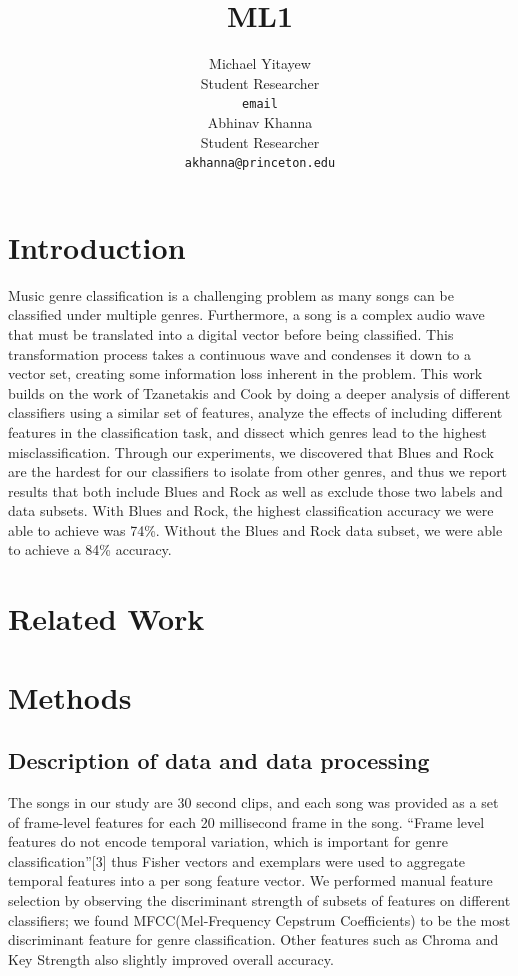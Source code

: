 \documentclass{article} %
\title{ML1}
\author{
Michael Yitayew\\
Student Researcher\\
\texttt{email} \\
\And
Abhinav Khanna \\
Student Researcher \\
\texttt{akhanna@princeton.edu} \\
}
\begin{document}
\maketitle

\begin{abstract}

\end{abstract}

\section{Introduction}

Music genre classification is a challenging problem as many songs can be classified under multiple genres. Furthermore, a song is a complex audio wave that must be translated into a digital vector before being classified. This transformation process takes a continuous wave and condenses it down to a vector set, creating some information loss inherent in the problem. This work builds on the work of Tzanetakis and Cook by doing a deeper analysis of different classifiers using a similar set of features, analyze the effects of including different features in the classification task, and dissect which genres lead to the highest misclassification. Through our experiments, we discovered that Blues and Rock are the hardest for our classifiers to isolate from other genres, and thus we report results that both include Blues and Rock as well as exclude those two labels and data subsets. With Blues and Rock, the highest classification accuracy we were able to achieve was 74\%. Without the Blues and Rock data subset, we were able to achieve a 84\% accuracy.

\section{Related Work}

\section{Methods}
\subsection{Description of data and data processing}
The songs in our study are 30 second clips, and each song was provided as a set of frame-level features for each 20 millisecond frame in the song. ``Frame level features do not encode temporal variation, which is important for genre classification''[3] thus Fisher vectors and exemplars were used to aggregate temporal features into a per song feature vector. 
We performed manual feature selection by observing the discriminant strength of subsets of features on different classifiers; we found MFCC(Mel-Frequency Cepstrum Coefficients) to be the most discriminant feature for genre classification. Other features such as Chroma and Key Strength also slightly improved overall accuracy. 
\end{document}
